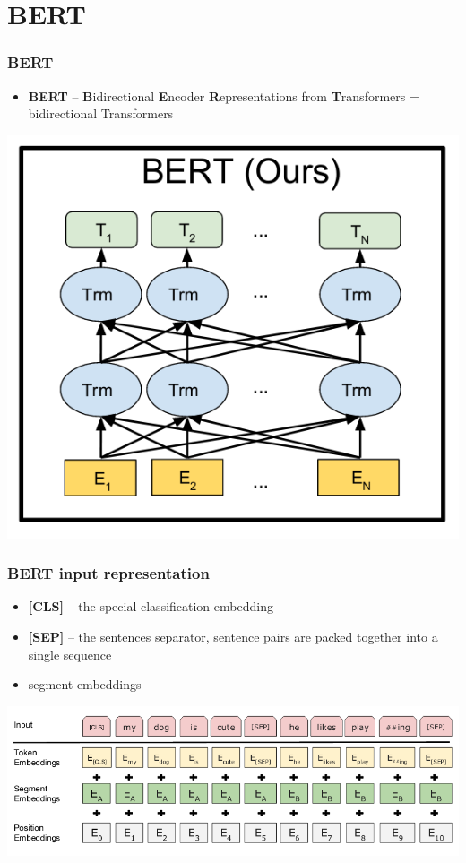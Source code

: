 \documentclass{beamer}
\begin{document}
\section{BERT}
\begin{frame}
    \frametitle{BERT \cite{bert}}
    \begin{itemize}
        \item \textbf{BERT} -- \textbf{B}idirectional \textbf{E}ncoder \textbf{R}epresentations from \textbf{T}ransformers = bidirectional Transformers
    \end{itemize}
    \begin{center}
        \includegraphics[scale=1.0]{img/bert.png}
    \end{center}
\end{frame}

\begin{frame}
    \frametitle{BERT input representation}
    \begin{itemize}
        \item \textbf{[CLS]} -- the special classification embedding
        \item \textbf{[SEP]} -- the sentences separator, sentence pairs are packed together into a single sequence
        \item segment embeddings
    \end{itemize}
    \begin{center}
        \includegraphics[scale=1.4]{img/bert_input.png}
    \end{center}
\end{frame}
\end{document}
